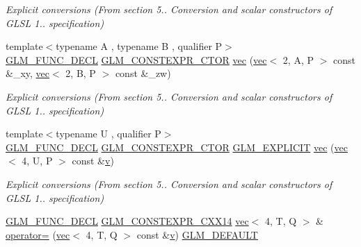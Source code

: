 \begin{DoxyCompactItemize}
\begin{DoxyCompactList}\small\item\em Explicit conversions (From section 5.. Conversion and scalar constructors of G\+L\+SL 1.. specification) \end{DoxyCompactList}\item 
{\footnotesize template$<$typename A , typename B , qualifier P$>$ }\\\hyperlink{setup_8hpp_ab2d052de21a70539923e9bcbf6e83a51}{G\+L\+M\+\_\+\+F\+U\+N\+C\+\_\+\+D\+E\+CL} \hyperlink{setup_8hpp_ad34178a09666081abdb573c14d1f4a5a}{G\+L\+M\+\_\+\+C\+O\+N\+S\+T\+E\+X\+P\+R\+\_\+\+C\+T\+OR} \hyperlink{structglm_1_1vec_3_014_00_01_t_00_01_q_01_4_af18e05d8f9e28ed3dab7cd8b2150fede}{vec} (\hyperlink{structglm_1_1vec}{vec}$<$ 2, A, P $>$ const \&\+\_\+xy, \hyperlink{structglm_1_1vec}{vec}$<$ 2, B, P $>$ const \&\+\_\+zw)
\begin{DoxyCompactList}\small\item\em Explicit conversions (From section 5.. Conversion and scalar constructors of G\+L\+SL 1.. specification) \end{DoxyCompactList}\item 
{\footnotesize template$<$typename U , qualifier P$>$ }\\\hyperlink{setup_8hpp_ab2d052de21a70539923e9bcbf6e83a51}{G\+L\+M\+\_\+\+F\+U\+N\+C\+\_\+\+D\+E\+CL} \hyperlink{setup_8hpp_ad34178a09666081abdb573c14d1f4a5a}{G\+L\+M\+\_\+\+C\+O\+N\+S\+T\+E\+X\+P\+R\+\_\+\+C\+T\+OR} \hyperlink{setup_8hpp_a6c74f5a5e7b134ab69023ff9a30d4d5d}{G\+L\+M\+\_\+\+E\+X\+P\+L\+I\+C\+IT} \hyperlink{structglm_1_1vec_3_014_00_01_t_00_01_q_01_4_ad1532b19e40e767e98e2ca54aef6a6f4}{vec} (\hyperlink{structglm_1_1vec}{vec}$<$ 4, U, P $>$ const \&\hyperlink{_s_d_l__opengl_8h_a10a82eabcb59d2fcd74acee063775f90}{v})
\begin{DoxyCompactList}\small\item\em Explicit conversions (From section 5.. Conversion and scalar constructors of G\+L\+SL 1.. specification) \end{DoxyCompactList}\item 
\hyperlink{setup_8hpp_ab2d052de21a70539923e9bcbf6e83a51}{G\+L\+M\+\_\+\+F\+U\+N\+C\+\_\+\+D\+E\+CL} \hyperlink{setup_8hpp_a4dd12abf5e1164bc57f3a34671d03844}{G\+L\+M\+\_\+\+C\+O\+N\+S\+T\+E\+X\+P\+R\+\_\+\+C\+X\+X14} \hyperlink{structglm_1_1vec}{vec}$<$ 4, T, Q $>$ \& \hyperlink{structglm_1_1vec_3_014_00_01_t_00_01_q_01_4_aecb1fc48895abb231dc7bd64a941ec51}{operator=} (\hyperlink{structglm_1_1vec}{vec}$<$ 4, T, Q $>$ const \&\hyperlink{_s_d_l__opengl_8h_a10a82eabcb59d2fcd74acee063775f90}{v}) \hyperlink{setup_8hpp_aefce7051c376a64ba89fa93a9f63bc2c}{G\+L\+M\+\_\+\+D\+E\+F\+A\+U\+LT}

\end{DoxyCompactItemize}
